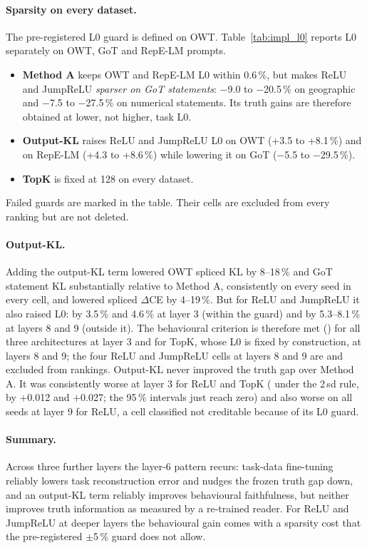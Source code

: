 

\paragraph{Sparsity on every dataset.} The pre-registered L0 guard is defined on OWT. Table~\ref{tab:impl_l0} reports
L0 separately on OWT, GoT and RepE-LM prompts.
\begin{itemize}
  \item \textbf{Method A} keeps OWT and RepE-LM L0 within 0.6\,\%, but makes ReLU and JumpReLU \emph{sparser on GoT
        statements}: $-$9.0 to $-$20.5\,\% on geographic and $-$7.5 to $-$27.5\,\% on numerical statements. Its truth gains
        are therefore obtained at lower, not higher, task L0.
  \item \textbf{Output-KL} raises ReLU and JumpReLU L0 on OWT (+3.5 to +8.1\,\%) and on RepE-LM (+4.3 to +8.6\,\%)
        while lowering it on GoT ($-$5.5 to $-$29.5\,\%).
  \item \textbf{TopK} is fixed at 128 on every dataset.
\end{itemize}
Failed guards are marked in the table. Their cells are excluded from every ranking but are not deleted.



\paragraph{Output-KL.} Adding the output-KL term lowered OWT spliced KL by 8--18\,\% and GoT statement KL substantially
relative to Method A, consistently on every seed in every cell, and lowered spliced $\Delta$CE by 4--19\,\%. But for ReLU
and JumpReLU it also raised L0: by 3.5\,\% and 4.6\,\% at layer 3 (within the guard) and by 5.3--8.1\,\% at layers 8 and 9
(outside it). The behavioural criterion is therefore met () for all three
architectures at layer 3 and for TopK, whose L0 is fixed by construction, at layers 8 and 9; the four ReLU and JumpReLU
cells at layers 8 and 9 are  and excluded from rankings. Output-KL never improved the truth gap
over Method A. It was consistently worse at layer 3 for ReLU and TopK ( under the 2\,sd rule, by
$+$0.012 and $+$0.027; the 95\,\% intervals just reach zero) and also worse on all
seeds at layer 9 for ReLU, a cell classified not creditable because of its L0 guard.

\paragraph{Summary.} Across three further layers the layer-6 pattern recurs: task-data fine-tuning reliably lowers task
reconstruction error and nudges the frozen truth gap down, and an output-KL term reliably improves behavioural
faithfulness, but neither improves truth information as measured by a re-trained reader. For ReLU and JumpReLU at
deeper layers the behavioural gain comes with a sparsity cost that the pre-registered $\pm$5\,\% guard does not allow.

